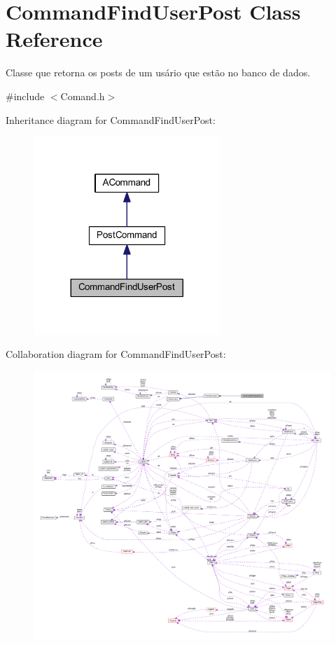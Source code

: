 \hypertarget{class_command_find_user_post}{\section{Command\-Find\-User\-Post Class Reference}
\label{class_command_find_user_post}
}


Classe que retorna os posts de um usário que estão no banco de dados.  




{\ttfamily \#include $<$Comand.\-h$>$}



Inheritance diagram for Command\-Find\-User\-Post\-:\nopagebreak
\begin{figure}[H]
\begin{center}
\leavevmode
\includegraphics[width=200pt]{class_command_find_user_post__inherit__graph}
\end{center}
\end{figure}


Collaboration diagram for Command\-Find\-User\-Post\-:\nopagebreak
\begin{figure}[H]
\begin{center}
\leavevmode
\includegraphics[width=350pt]{class_command_find_user_post__coll__graph}
\end{center}
\end{figure}
